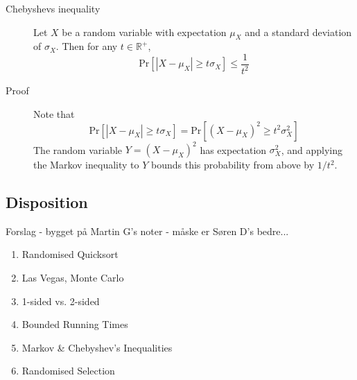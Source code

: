 \begin{description}
\item[Chebyshevs inequality] Let $X$ be a random variable with expectation
  $\mu_X$ and a standard deviation of $\sigma_X$. Then for any $t \in
  \mathbb{R}^+$,
  \[
    \text{Pr}[|X - \mu_X| \geq t\sigma_X] \leq \frac{1}{t^2}
  \]
\item[Proof] Note that
  \[
    \text{Pr}[|X - \mu_X| \geq t\sigma_X] = \text{Pr}[(X - \mu_X)^2 \geq
    t^2\sigma_X^2]
  \]
  The random variable $Y = (X - \mu_X)^2$ has expectation $\sigma_X^2$, and
  applying the Markov inequality to $Y$ bounds this probability from above by
  $1/t^2$. 
\end{description}

\subsection{Disposition}
Forslag - bygget på Martin G's noter - måske er Søren D's bedre...

\begin{enumerate}
	\item Randomised Quicksort
	\item Las Vegas, Monte Carlo
	\item 1-sided vs. 2-sided
	\item Bounded Running Times
	\item Markov \& Chebyshev's Inequalities
	\item Randomised Selection
\end{enumerate}